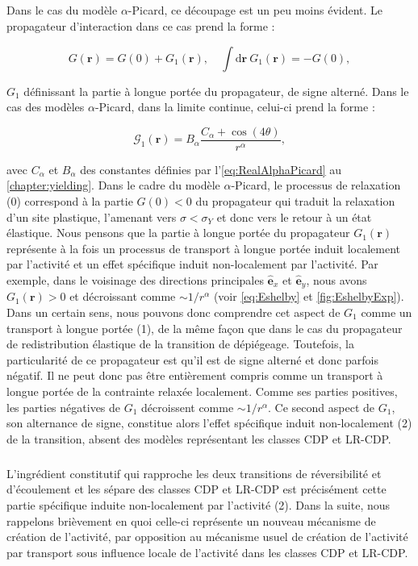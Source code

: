 \subparagraph{}Dans le cas du modèle $\alpha$-Picard, ce découpage est un peu moins évident. Le propagateur d'interaction dans ce cas prend la forme :

\begin{equation}
	G(\mathbf{r}) = G(0) + G_1(\mathbf{r}), \quad \int \mathrm{d}\mathbf{r}~ G_1(\mathbf{r}) = -G(0),
\end{equation}

\noindent $G_1$ définissant la partie à longue portée du propagateur, de signe alterné. Dans le cas des modèles $\alpha$-Picard, dans la limite continue, celui-ci prend la forme :

\begin{equation}
	\mathcal{G}_1(\mathbf{r}) = B_\alpha\frac{C_\alpha + \cos (4\theta)}{r^\alpha},
\end{equation}

\noindent avec $C_\alpha$ et $B_\alpha$ des constantes définies par l'\autoref{eq:RealAlphaPicard} au \autoref{chapter:yielding}. Dans le cadre du modèle $\alpha$-Picard, le processus de relaxation (0) correspond à la partie $G(0)<0$ du propagateur qui traduit la relaxation d'un site plastique, l'amenant vers $\sigma < \sigma_Y$ et donc vers le retour à un état élastique. Nous pensons que la partie à longue portée du propagateur $G_1(\mathbf{r})$ représente à la fois un processus de transport à longue portée induit localement par l'activité et un effet spécifique induit non-localement par l'activité. Par exemple, dans le voisinage des directions principales $\hat{\mathbf{e}}_x$ et $\hat{\mathbf{e}}_y$, nous avons $G_1(\mathbf{r})>0$ et décroissant comme $\sim 1/r^\alpha$ (voir \autoref{eq:Eshelby} et \autoref{fig:EshelbyExp}). Dans un certain sens, nous pouvons donc comprendre cet aspect de $G_1$ comme un transport à longue portée (1), de la même façon que dans le cas du propagateur de redistribution élastique de la transition de dépiégeage. Toutefois, la particularité de ce propagateur est qu'il est de signe alterné et donc parfois négatif. Il ne peut donc pas être entièrement compris comme un transport à longue portée de la contrainte relaxée localement. Comme ses parties positives, les parties négatives de $G_1$ décroissent comme $\sim 1/r^\alpha$. Ce second aspect de $G_1$, son alternance de signe, constitue alors l'effet spécifique induit non-localement (2) de la transition, absent des modèles représentant les classes CDP et LR-CDP.

\subparagraph{}L'ingrédient constitutif qui rapproche les deux transitions de réversibilité et d'écoulement et les sépare des classes CDP et LR-CDP est précisément cette partie spécifique induite non-localement par l'activité (2). Dans la suite, nous rappelons brièvement en quoi celle-ci représente un nouveau mécanisme de création de l'activité, par opposition au mécanisme usuel de création de l'activité par transport sous influence locale de l'activité dans les classes CDP et LR-CDP.

